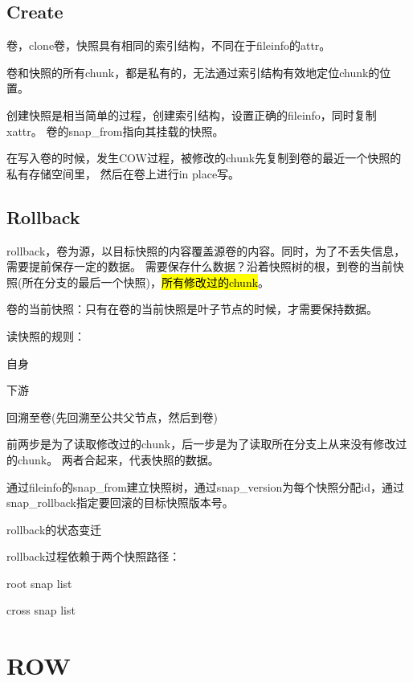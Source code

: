 \subsection{Create}

卷，clone卷，快照具有相同的索引结构，不同在于fileinfo的attr。

卷和快照的所有chunk，都是私有的，无法通过索引结构有效地定位chunk的位置。

创建快照是相当简单的过程，创建索引结构，设置正确的fileinfo，同时复制xattr。
卷的snap\_from指向其挂载的快照。

在写入卷的时候，发生COW过程，被修改的chunk先复制到卷的最近一个快照的私有存储空间里，
然后在卷上进行in place写。

\subsection{Rollback}

rollback，卷为源，以目标快照的内容覆盖源卷的内容。同时，为了不丢失信息，需要提前保存一定的数据。
需要保存什么数据？沿着快照树的根，到卷的当前快照(所在分支的最后一个快照)，\hl{所有修改过的chunk}。

卷的当前快照：只有在卷的当前快照是叶子节点的时候，才需要保持数据。

读快照的规则：
\begin{compactenum}
\item 自身
\item 下游
\item 回溯至卷(先回溯至公共父节点，然后到卷)
\end{compactenum}

前两步是为了读取修改过的chunk，后一步是为了读取所在分支上从来没有修改过的chunk。
两者合起来，代表快照的数据。

通过fileinfo的snap\_from建立快照树，通过snap\_version为每个快照分配id，通过snap\_rollback指定要回滚的目标快照版本号。

rollback的状态变迁

rollback过程依赖于两个快照路径：
\begin{compactenum}
\item root snap list
\item cross snap list
\end{compactenum}


\section{ROW}


